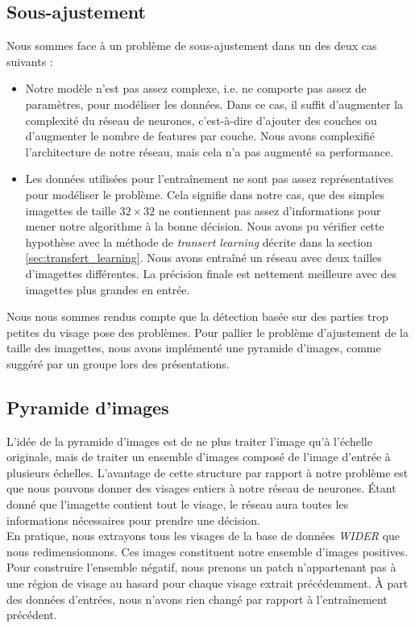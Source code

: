 \documentclass[a4paper,11pt]{article}
\begin{document}
\subsection{Sous-ajustement}
\label{sec:sous-ajustement}

    Nous sommes face à un problème de sous-ajustement dans un des deux cas suivants :
    \begin{itemize}
        \item 
            Notre modèle n'est pas assez complexe, i.e. ne comporte pas assez de paramètres, pour modéliser les données.
            Dans ce cas, il suffit d'augmenter la complexité du réseau de neurones, c'est-à-dire d'ajouter des couches ou d'augmenter le nombre de features par couche.
            Nous avons complexifié l'architecture de notre réseau, mais cela n'a pas augmenté sa performance.

        \item
            Les données utilisées pour l'entraînement ne sont pas assez représentatives pour modéliser le problème.
            Cela signifie dans notre cas, que des simples imagettes de taille $32\times32$ ne contiennent pas assez d'informations pour mener notre algorithme à la bonne décision.
            Nous avons pu vérifier cette hypothèse avec la méthode de \textit{transert learning} décrite dans la section \ref{sec:transfert_learning}.
            Nous avons entraîné un réseau avec deux tailles d'imagettes différentes.
            La précision finale est nettement meilleure avec des imagettes plus grandes en entrée. 
    \end{itemize}

    Nous nous sommes rendus compte que la détection basée sur des parties trop petites du visage pose des problèmes.
    Pour pallier le problème d'ajustement de la taille des imagettes, nous avons implémenté une
    pyramide d'images, comme suggéré par un groupe lors des présentations.

\subsection{Pyramide d'images}

    L'idée de la pyramide d'images est de ne plus traiter l'image qu'à l'échelle originale, mais de traiter un ensemble d'images composé de l'image d'entrée à plusieurs échelles.
    L'avantage de cette structure par rapport à notre problème est que nous pouvons donner des visages entiers à notre réseau de neurones.
    Étant donné que l'imagette contient tout le visage, le réseau aura toutes les informations nécessaires pour prendre une décision.
    \\
    En pratique, nous extrayons tous les visages de la base de données \textit{WIDER} que nous redimensionnons.
    Ces images constituent notre ensemble d'images positives.
    Pour construire l'ensemble négatif, nous prenons un patch n'appartenant pas à une région de visage au hasard pour chaque visage extrait précédemment.
    À part des données d'entrées, nous n'avons rien changé par rapport à l'entraînement précédent.
\end{document}
